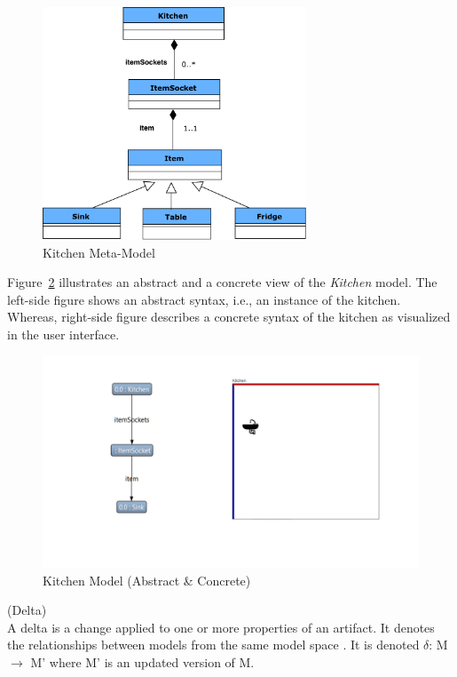 \begin{figure}
	\centering
	\includegraphics[width=0.7\textwidth]{figures/Kitchen_MetaModel}
	\caption{Kitchen Meta-Model}
	\label{fig:Kitchen_MetaModel}
\end{figure}

Figure~\ref{fig:Kitchen_AbstractConcrete} illustrates an abstract and a concrete view of the \textit{Kitchen} model. The left-side figure shows an abstract syntax, i.e., an instance of the kitchen. Whereas, right-side figure describes a concrete syntax of the kitchen as visualized in the user interface.\\

\begin{figure}
	\centering
	\includegraphics[width=1\textwidth]{figures/Kitchen_AbstractConcrete}
	\caption{Kitchen Model (Abstract \& Concrete)}
	\label{fig:Kitchen_AbstractConcrete}
\end{figure}

\begin{defn}\label{defDelta} (Delta)\\
A delta is a change applied to one or more properties of an artifact. It denotes the relationships between models from the same model space \cite{benchmarx-reload}. It is denoted $\delta$: M $\longrightarrow$ M' where M' is an updated version of M.
\end{defn}

